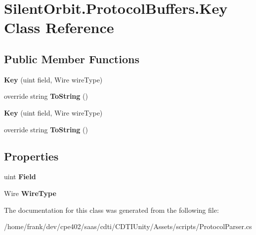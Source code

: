\hypertarget{class_silent_orbit_1_1_protocol_buffers_1_1_key}{}\section{Silent\+Orbit.\+Protocol\+Buffers.\+Key Class Reference}
\label{class_silent_orbit_1_1_protocol_buffers_1_1_key}
\subsection*{Public Member Functions}
\begin{DoxyCompactItemize}
\item 
\hypertarget{class_silent_orbit_1_1_protocol_buffers_1_1_key_afec25f3e95b45ea1637725a855e81360}{}{\bfseries Key} (uint field, Wire wire\+Type)\label{class_silent_orbit_1_1_protocol_buffers_1_1_key_afec25f3e95b45ea1637725a855e81360}

\item 
\hypertarget{class_silent_orbit_1_1_protocol_buffers_1_1_key_ae46395a4028f035c19a07caa680f1ad0}{}override string {\bfseries To\+String} ()\label{class_silent_orbit_1_1_protocol_buffers_1_1_key_ae46395a4028f035c19a07caa680f1ad0}

\item 
\hypertarget{class_silent_orbit_1_1_protocol_buffers_1_1_key_afec25f3e95b45ea1637725a855e81360}{}{\bfseries Key} (uint field, Wire wire\+Type)\label{class_silent_orbit_1_1_protocol_buffers_1_1_key_afec25f3e95b45ea1637725a855e81360}

\item 
\hypertarget{class_silent_orbit_1_1_protocol_buffers_1_1_key_ae46395a4028f035c19a07caa680f1ad0}{}override string {\bfseries To\+String} ()\label{class_silent_orbit_1_1_protocol_buffers_1_1_key_ae46395a4028f035c19a07caa680f1ad0}

\end{DoxyCompactItemize}
\subsection*{Properties}
\begin{DoxyCompactItemize}
\item 
\hypertarget{class_silent_orbit_1_1_protocol_buffers_1_1_key_a633f5ab095f7ed07ae3767d719834747}{}uint {\bfseries Field}\label{class_silent_orbit_1_1_protocol_buffers_1_1_key_a633f5ab095f7ed07ae3767d719834747}

\item 
\hypertarget{class_silent_orbit_1_1_protocol_buffers_1_1_key_a0080c3bd74cda7b92d7066cdeb25f819}{}Wire {\bfseries Wire\+Type}\label{class_silent_orbit_1_1_protocol_buffers_1_1_key_a0080c3bd74cda7b92d7066cdeb25f819}

\end{DoxyCompactItemize}


The documentation for this class was generated from the following file\+:\begin{DoxyCompactItemize}
\item 
/home/frank/dev/cpe402/saas/cdti/\+C\+D\+T\+I\+Unity/\+Assets/scripts/Protocol\+Parser.\+cs\end{DoxyCompactItemize}
